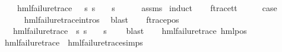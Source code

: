 \begin{isabellebody}
\ \ \ {\isachardoublequoteopen}{\isasymexists}{\isasympsi}{\isachardot}{\kern0pt}\ hml{\isacharunderscore}{\kern0pt}failure{\isacharunderscore}{\kern0pt}trace\ {\isasympsi}\ {\isasymand}\ {\isacharparenleft}{\kern0pt}{\isasymforall}s{\isachardot}{\kern0pt}\ {\isacharparenleft}{\kern0pt}s\ {\isasymTurnstile}\ {\isasymphi}{\isacharparenright}{\kern0pt}\ {\isasymlongleftrightarrow}\ {\isacharparenleft}{\kern0pt}s\ {\isasymTurnstile}\ {\isasympsi}{\isacharparenright}{\kern0pt}{\isacharparenright}{\kern0pt}{\isachardoublequoteclose}\isanewline
%
\isadelimproof
\ \ %
\endisadelimproof
%
\isatagproof
{}\isamarkupfalse%
\ assms\ \isamarkupfalse%
{\isacharparenleft}{\kern0pt}induct{\isacharparenright}{\kern0pt}\isanewline
\ \ \isamarkupfalse%
\ f{\isacharunderscore}{\kern0pt}trace{\isacharunderscore}{\kern0pt}tt\isanewline
\ \ \isamarkupfalse%
\ \isamarkupfalse%
\ {\isacharquery}{\kern0pt}case\ \isanewline
\ \ \ \ \isamarkupfalse%
\ hml{\isacharunderscore}{\kern0pt}failure{\isacharunderscore}{\kern0pt}trace{\isachardot}{\kern0pt}intros{\isacharparenleft}{\kern0pt}{}{\isacharparenright}{\kern0pt}\ \isamarkupfalse%
\ blast\isanewline
{}\isamarkupfalse%
\isanewline
\ \ \isamarkupfalse%
\ {\isacharparenleft}{\kern0pt}f{\isacharunderscore}{\kern0pt}trace{\isacharunderscore}{\kern0pt}pos\ {\isasymphi}\ {\isasymalpha}{\isacharparenright}{\kern0pt}\isanewline
\ \ \isamarkupfalse%
\ \isamarkupfalse%
\ {\isasympsi}\ \ {\isachardoublequoteopen}hml{\isacharunderscore}{\kern0pt}failure{\isacharunderscore}{\kern0pt}trace\ {\isasympsi}{\isachardoublequoteclose}\ {\isachardoublequoteopen}{\isacharparenleft}{\kern0pt}{\isasymforall}s{\isachardot}{\kern0pt}\ {\isacharparenleft}{\kern0pt}s\ {\isasymTurnstile}\ {\isasymphi}{\isacharparenright}{\kern0pt}\ {\isacharequal}{\kern0pt}\ {\isacharparenleft}{\kern0pt}s\ {\isasymTurnstile}\ {\isasympsi}{\isacharparenright}{\kern0pt}{\isacharparenright}{\kern0pt}{\isachardoublequoteclose}\ \isamarkupfalse%
\ blast\isanewline
\ \ \isamarkupfalse%
\ {\isachardoublequoteopen}hml{\isacharunderscore}{\kern0pt}failure{\isacharunderscore}{\kern0pt}trace\ {\isacharparenleft}{\kern0pt}hml{\isacharunderscore}{\kern0pt}pos\ {\isasymalpha}\ {\isasympsi}{\isacharparenright}{\kern0pt}{\isachardoublequoteclose}\ \isanewline
\ \ \ \ \isamarkupfalse%
\ {\isacartoucheopen}hml{\isacharunderscore}{\kern0pt}failure{\isacharunderscore}{\kern0pt}trace\ {\isasympsi}{\isacartoucheclose}\ hml{\isacharunderscore}{\kern0pt}failure{\isacharunderscore}{\kern0pt}trace{\isachardot}{\kern0pt}simps\ \isamarkupfalse%

\end{isabellebody}
